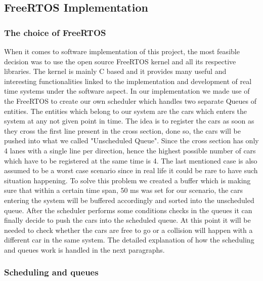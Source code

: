 \documentclass[conference]{IEEEtran}
\begin{document}
\subsection{FreeRTOS Implementation}

\subsubsection{The choice of FreeRTOS}

When it comes to software implementation of this project, the most feasible decision was to use the open source FreeRTOS kernel and all its respective libraries. The kernel is mainly C based and it provides many useful and interesting functionalities linked to the implementation and development of real time systems under the software aspect. In our implementation we made use of the FreeRTOS to create our own scheduler which handles two separate Queues of entities. The entities which belong to our system are the cars which enters the system at any not given point in time. The idea is to register the cars as soon as they cross the first line present in the cross section, done so, the cars will be pushed into what we called "Unscheduled Queue". Since the cross section has only 4 lanes with a single line per direction, hence the highest possible number of cars which have to be registered at the same time is 4. The last mentioned case is also assumed to be a worst case scenario since in real life it could be rare to have such situation happening. To solve this problem we created a buffer which is making sure that within a certain time span, 50 ms was set for our scenario, the cars entering the system will be buffered accordingly and sorted into the unscheduled queue. After the scheduler performs some conditions checks in the queues it can finally decide to push the cars into the scheduled queue. At this point it will be needed to check whether the cars are free to go or a collision will happen with a different car in the same system. The detailed explanation of how the scheduling and queues work is handled in the next paragraphs.

\subsubsection{Scheduling and queues}
\end{document}
